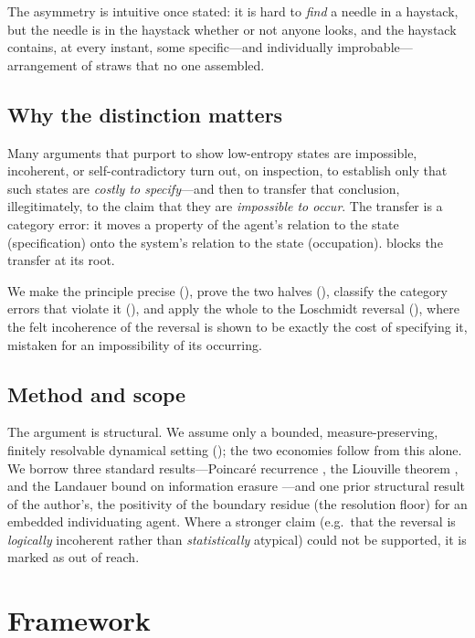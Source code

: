 \documentclass[11pt,a4paper]{article}
\theoremstyle{thmstyle}
\theoremstyle{definition}
\theoremstyle{remark}
\begin{document}
The asymmetry is intuitive once stated: it is hard to \emph{find} a needle in a
haystack, but the needle is in the haystack whether or not anyone looks, and the
haystack contains, at every instant, some specific---and individually
improbable---arrangement of straws that no one assembled.

\subsection{Why the distinction matters}

Many arguments that purport to show low-entropy states are impossible,
incoherent, or self-contradictory turn out, on inspection, to establish only
that such states are \emph{costly to specify}---and then to transfer that
conclusion, illegitimately, to the claim that they are \emph{impossible to
occur}. The transfer is a category error: it moves a property of the agent's
relation to the state (specification) onto the system's relation to the state
(occupation).  blocks the transfer at its root.

We make the principle precise (), prove the two halves
(), classify the category errors that violate it
(), and apply the whole to the Loschmidt reversal
(), where the felt incoherence of the reversal is shown to
be exactly the cost of specifying it, mistaken for an impossibility of its
occurring.

\subsection{Method and scope}

The argument is structural. We assume only a bounded, measure-preserving,
finitely resolvable dynamical setting (); the two economies
follow from this alone. We borrow three standard results---Poincar\'e
recurrence \citep{poincare1890}, the Liouville theorem \citep{arnold1989}, and
the Landauer bound on information erasure
\citep{landauer1961,bennett1982}---and one prior structural result of the
author's, the positivity of the boundary residue (the resolution floor) for an
embedded individuating agent. Where a stronger claim (e.g.\ that the reversal is
\emph{logically} incoherent rather than \emph{statistically} atypical) could not
be supported, it is marked as out of reach.

\section{Framework}
\label{sec:framework}
\end{document}
